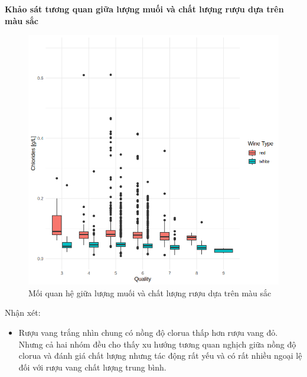 \textbf{Khảo sát tương quan giữa lượng muối và chất lượng rượu dựa trên màu sắc}
\begin{figure}[H]
    \centering
    \includegraphics[width=0.75\columnwidth]{wine_colors/wine_chlorides_quality_color.png}
    \caption{Mối quan hệ giữa lượng muối và chất lượng rượu dựa trên màu sắc}
    \label{fig:wine_chlorides_quality_color}
\end{figure}
Nhận xét:
\begin{itemize}
    \item Rượu vang trắng nhìn chung có nồng độ clorua thấp hơn rượu vang đỏ. Nhưng cả hai nhóm đều cho thấy xu hướng tương quan nghịch giữa nồng độ clorua và đánh giá chất lượng nhưng tác động rất yếu và có rất nhiều ngoại lệ đối với rượu vang chất lượng trung bình.
\end{itemize}


